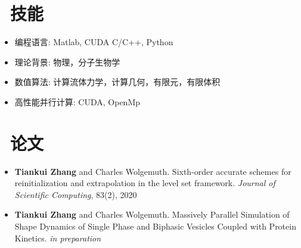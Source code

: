 \documentclass{resume}
\begin{document}


\section{\faCogs\ 技能}
\begin{itemize}[parsep=0.5ex]
  \item 编程语言: Matlab, CUDA C/C++, Python
  \item 理论背景: 物理，分子生物学
  \item 数值算法: 计算流体力学，计算几何，有限元，有限体积
  \item 高性能并行计算: CUDA, OpenMp
\end{itemize}

\section{\faBook\ 论文}
\begin{itemize}[parsep=0.5ex]
  \item \textbf{Tiankui Zhang} and Charles Wolgemuth. Sixth-order accurate schemes for reinitialization and extrapolation in the level set framework. \textit{Journal of Scientific Computing}, 83(2), 2020
  \item \textbf{Tiankui Zhang} and Charles Wolgemuth. Massively Parallel Simulation of Shape Dynamics of Single Phase and Biphasic Vesicles Coupled with Protein Kinetics. \textit{in preparation}
\end{itemize}
\end{document}
